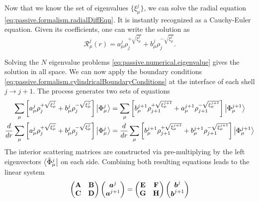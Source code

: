 Now that we know the set of eigenvalues $\{\xi_\mu^j\}$, we can solve the radial
equation \eqref{eq:passive.formalism.radialDiffEqn}. It is instantly recognized as 
a Cauchy-Euler equation. Given its coefficients, one can write the solution 
as \cite[p.~118-119]{GRE98}
  \begin{equation}
    \label{eq:sMatrix.radialSolution}
    \mathcal{R}_\mu^j(r) =  a_\mu^j\rho_j^{+\sqrt{\xi_\mu^j}}+b_\mu^j\rho_j^{-\sqrt{\xi_\mu^j}}.
  \end{equation}
  
Solving the $N$ eigenvalue problems \eqref{eq:passive.numerical.eigenvalue} gives
the solution in all space. We can now apply the boundary conditions \eqref{eq:passive.formalism.cylindricalBoundaryConditions}
at the interface of each shell $j\rightarrow j+1$. The process generates two sets of equations
  \begin{subequations}
  \label{eq:passive.numerical.boundaryCondition}
  \begin{align}
   \sum_\mu\left[a_\mu^j\rho_j^{+\sqrt{\xi_\mu^j}}+b_\mu^j\rho_j^{-\sqrt{\xi_\mu^j}}\right]\Ket{\Phi_\mu^j}
   &=
   \sum_\mu\left[b_\mu^{j+1}\rho_{j+1}^{+\sqrt{\xi_\mu^{j+1}}}+a_\mu^{j+1}\rho_{j+1}^{-\sqrt{\xi_\mu^{j+1}}}\right]\Ket{\Phi_\mu^{j+1}}	\\
   \frac{d}{dr}\sum_\mu\left[a_\mu^j\rho_j^{+\sqrt{\xi_\mu^j}}+b_\mu^j\rho_j^{-\sqrt{\xi_\mu^j}}\right]\Ket{\Phi_\mu^j}
   &=
   \frac{d}{dr}\sum_\mu\left[b_\mu^{j+1}\rho_{j+1}^{+\sqrt{\xi_\mu^{j+1}}}+b_\mu^{j+1}\rho_{j+1}^{-\sqrt{\xi_\mu^{j+1}}}\right]\Ket{\Phi_\mu^{j+1}}
  \end{align}
  \end{subequations}
The interior scattering matrices
are constructed via pre-multiplying by the left eigenvectors $\Bra{\tilde{\Phi}_\mu^j}$ on each side. 
Combining both resulting equations leads to the linear system 
  \begin{equation}
    \begin{pmatrix}\mathbf{A} & \mathbf{B} \\ \mathbf{C} & \mathbf{D} \end{pmatrix} \begin{pmatrix} \boldsymbol{a}^j \\ \boldsymbol{a}^{j+1}\end{pmatrix}
    =
    \begin{pmatrix}\mathbf{E} & \mathbf{F} \\ \mathbf{G} & \mathbf{H} \end{pmatrix} \begin{pmatrix} \boldsymbol{b}^j \\ \boldsymbol{b}^{j+1}\end{pmatrix}
  \end{equation}
